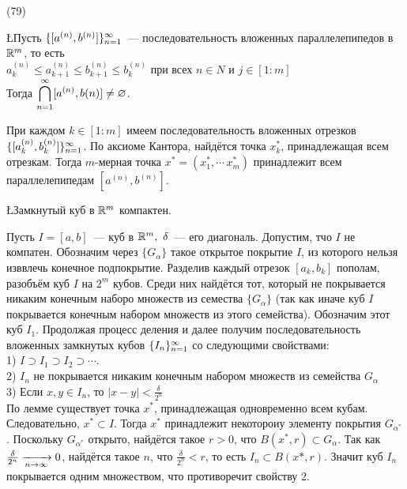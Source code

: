 (79)

\L Пусть $\{[a^{(n)}, b^{(n)}]\}^{\infty}_{n = 1}$~--- последовательность вложенных параллелепипедов в $\mathbb{R}^m$, то есть\\
$a^{(n)}_k\le a^{(n)}_{k + 1}\le b^{(n)}_{k + 1} \le b^{(n)}_k$ при всех $n \in N$ и $j \in [1: m]$\\
Тогда $\displaystyle \bigcap\limits^{\infty}_{n = 1} [a^{(n)}, b{(n)}] \neq \varnothing$.

\D При каждом $k \in [1: m]$ имеем последовательность вложенных отрезков $\{[a^{(n)}_k, b^{(n)}_k]\}^{\infty}_{n = 1}$. По аксиоме Кантора, найдётся точка $x^*_k$, принадлежащая всем отрезкам. Тогда $m$-мерная точка $x^* = (x^*_1, \cdots\, x^*_m)$ принадлежит всем параллелепипедам $[a^{(n)}, b^{(n)}]$.

\L Замкнутый куб в $\mathbb{R}^m$ компактен.

\D Пусть $I = [a, b]$~--- куб в $\mathbb{R}^m,\ \delta$~--- его диагональ. Допустим, тчо $I$ не компатен. Обозначим через $\{G_\alpha\}$ такое открытое покрытие $I$, из которого нельзя изввлечь конечное подпокрытие. Разделив каждый отрезок $[a_k, b_k]$ пополам, разобъём куб $I$ на $2^m$ кубов. Среди них найдётся тот, который не покрывается никаким конечным наборо множеств из семества $\{G_\alpha\}$ (так как иначе куб $I$ покрывается конечным набором множеств из этого семейства). Обозначим этот куб $I_1$. Продолжая процесс деления и далее получим последовательность вложенных замкнутых кубов $\{I_n\}^{\infty}_{n = 1}$ со следующими свойствами:\\
1) $I\supset I_1\supset I_2 \supset\cdots$.\\
2) $I_n$ не покрывается никаким конечным набором множеств из семейства $G_\alpha$\\
3) Если $x, y \in I_n$, то $|x - y| < \frac{\delta}{2^n}$\\
По лемме существует точка $x^*$, принадлежащая одновременно всем кубам. Следовательно, $x^* \subset I$. Тогда $x^*$ принадлежит некотороиу элементу покрытия $G_{\alpha^*}$. Поскольку $G_{\alpha^*}$ открыто, найдётся такое $r > 0$, что $B(x^*, r) \subset G_\alpha$. Так как $\frac{\delta}{2^n}\xrightarrow[n\to\infty]{} 0$, найдётся такое $n$, что $\frac{\delta}{2^n} < r$, то есть $I_n \subset B(x*, r)$. Значит куб $I_n$ покрывается одним множеством, что противоречит свойству 2.